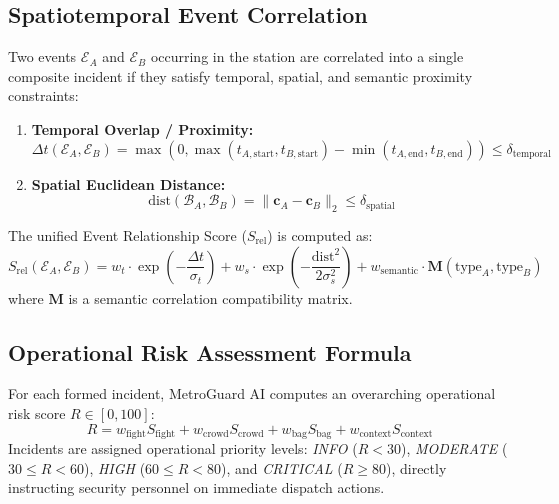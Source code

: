 \documentclass[12pt,a4paper]{report}
\begin{document}
\subsection{Spatiotemporal Event Correlation}
Two events $\mathcal{E}_A$ and $\mathcal{E}_B$ occurring in the station are correlated into a single composite incident if they satisfy temporal, spatial, and semantic proximity constraints:
\begin{enumerate}
    \item \textbf{Temporal Overlap / Proximity:}
    \begin{equation}
        \Delta t(\mathcal{E}_A, \mathcal{E}_B) = \max\left( 0, \max(t_{A,\text{start}}, t_{B,\text{start}}) - \min(t_{A,\text{end}}, t_{B,\text{end}}) \right) \le \delta_{\text{temporal}}
    \end{equation}
    \item \textbf{Spatial Euclidean Distance:}
    \begin{equation}
        \text{dist}(\mathcal{B}_A, \mathcal{B}_B) = \| \mathbf{c}_A - \mathbf{c}_B \|_2 \le \delta_{\text{spatial}}
    \end{equation}
\end{enumerate}
The unified Event Relationship Score ($S_{\text{rel}}$) is computed as:
\begin{equation}
    S_{\text{rel}}(\mathcal{E}_A, \mathcal{E}_B) = w_t \cdot \exp\left( -\frac{\Delta t}{\sigma_t} \right) + w_s \cdot \exp\left( -\frac{\text{dist}^2}{2\sigma_s^2} \right) + w_{\text{semantic}} \cdot \mathbf{M}(\text{type}_A, \text{type}_B)
\end{equation}
where $\mathbf{M}$ is a semantic correlation compatibility matrix.

\subsection{Operational Risk Assessment Formula}
For each formed incident, MetroGuard AI computes an overarching operational risk score $R \in [0, 100]$:
\begin{equation}
    R = w_{\text{fight}} S_{\text{fight}} + w_{\text{crowd}} S_{\text{crowd}} + w_{\text{bag}} S_{\text{bag}} + w_{\text{context}} S_{\text{context}}
\end{equation}
Incidents are assigned operational priority levels: \emph{INFO} ($R < 30$), \emph{MODERATE} ($30 \le R < 60$), \emph{HIGH} ($60 \le R < 80$), and \emph{CRITICAL} ($R \ge 80$), directly instructing security personnel on immediate dispatch actions.
\end{document}
